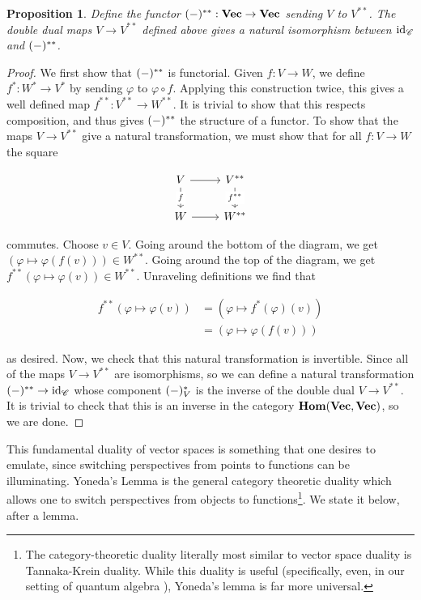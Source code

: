 \documentclass{article}
\newtheorem{proposition}{Proposition}[section]
\theoremstyle{definition}
\numberwithin{figure}{section}
\begin{document}
\begin{proposition} Define the functor $(\--)^{**}: \bold{Vec} \to \bold{Vec}$ sending $V$ to $V^{**}$. The double dual maps $V\to V^{**}$ defined above gives a natural isomorphism between $\mathrm{id}_{\mathscr{C}}$ and $(\--)^{**}$.
\end{proposition}
\begin{proof} We first show that $(\--)^{**}$ is functorial. Given $f:V\to W$, we define $f^{*}:W^{*}\to V^{*}$ by sending $\varphi$ to $\varphi \circ f$. Applying this construction twice, this gives a well defined map $f^{**}:V^{**}\to W^{**}$. It is trivial to show that this respects composition, and thus gives $(\--)^{**}$ the structure of a functor. To show that the maps $V\to V^{**}$ give a natural transformation, we must show that for all $f:V\to W$ the square

\[\begin{tikzcd}
	V & {V^{**}} \\
	W & {W^{**}}
	\arrow["f"{description}, from=1-1, to=2-1]
	\arrow["{f^{**}}"{description}, from=1-2, to=2-2]
	\arrow[from=1-1, to=1-2]
	\arrow[from=2-1, to=2-2]
\end{tikzcd}\]

commutes. Choose $v\in V$. Going around the bottom of the diagram, we get $(\varphi \mapsto \varphi(f(v)))\in W^{**}$. Going around the top of the diagram, we get $f^{**}(\varphi\mapsto \varphi(v))\in W^{**}$. Unraveling definitions we find that

\begin{align*}
f^{**}(\varphi\mapsto \varphi(v))&=\left(\varphi\mapsto f^{*}(\varphi)(v)\right)\\
&=\left(\varphi\mapsto \varphi(f(v))\right)
\end{align*}

as desired. Now, we check that this natural transformation is invertible. Since all of the maps $V\to V^{**}$ are isomorphisms, so we can define a natural transformation $(\--)^{**}\to\mathrm{id}_{\mathscr{C}}$ whose component $(\--)^{\**}_{V}$ is the inverse of the double dual $V\to V^{**}$. It is trivial to check that this is an inverse in the category $\bold{Hom}(\bold{Vec},\bold{Vec})$, so we are done.
\end{proof}

This fundamental duality of vector spaces is something that one desires to emulate, since switching perspectives from points to functions can be illuminating. Yoneda's Lemma is the general category theoretic duality which allows one to switch perspectives from objects to functions\footnote{The category-theoretic duality literally most similar to vector space duality is Tannaka-Krein duality. While this duality is useful (specifically, even, in our setting of quantum algebra \cite{joyal2006introduction}), Yoneda's lemma is far more universal.}. We state it below, after a lemma.
\end{document}
